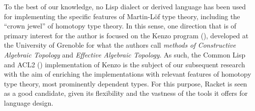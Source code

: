 To the best of our knowledge, no Lisp dialect or derived language has been
used for implementing the specific features of Martin-L\"{o}f type theory,
including the ``crown jewel'' of homotopy type theory. In this sense, one
direction that is of primary interest for the author is focused on the Kenzo
program (\cite{kenzo}), developed at the University of Grenoble for what
the authors call \emph{methods of Constructive Algebraic Topology} and
\emph{Effective Algebraic Topology}. As such, the Common Lisp and ACL2
(\cite{acl2}) implementation of Kenzo is the subject of our subsequent
research with the aim of enriching the implementations with relevant features
of homotopy type theory, most prominently dependent types. For this
purpose, Racket is seen as a good candidate, given its flexibility and
the vastness of the tools it offers for language design.





